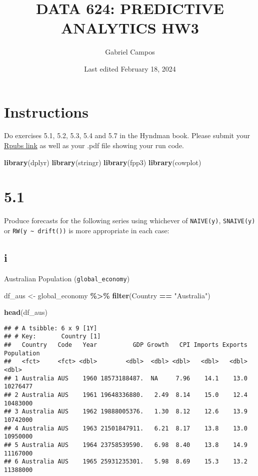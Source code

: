 \documentclass[
]{article}
\title{DATA 624: PREDICTIVE ANALYTICS HW3}
\author{Gabriel Campos}
\date{Last edited February 18, 2024}
\newenvironment{Shaded}{\begin{snugshade}}{\end{snugshade}}
\newcommand{\FunctionTok}[1]{\textcolor[rgb]{0.13,0.29,0.53}{\textbf{#1}}}
\newcommand{\NormalTok}[1]{#1}
\newcommand{\OtherTok}[1]{\textcolor[rgb]{0.56,0.35,0.01}{#1}}
\newcommand{\SpecialCharTok}[1]{\textcolor[rgb]{0.81,0.36,0.00}{\textbf{#1}}}
\newcommand{\StringTok}[1]{\textcolor[rgb]{0.31,0.60,0.02}{#1}}
\begin{document}
\maketitle

\hypertarget{instructions}{%
\section{Instructions}\label{instructions}}

Do exercises 5.1, 5.2, 5.3, 5.4 and 5.7 in the Hyndman book. Please
submit your \href{https://rpubs.com/gcampos100/DATA_624_HW3}{Rpubs link}
as well as your .pdf file showing your run code.

\begin{Shaded}
\begin{Highlighting}[]
\FunctionTok{library}\NormalTok{(dplyr)}
\FunctionTok{library}\NormalTok{(stringr)}
\FunctionTok{library}\NormalTok{(fpp3)}
\FunctionTok{library}\NormalTok{(cowplot)}
\end{Highlighting}
\end{Shaded}

\hypertarget{section}{%
\section{5.1}\label{section}}

Produce forecasts for the following series using whichever of
\texttt{NAIVE(y)}, \texttt{SNAIVE(y)} or
\texttt{RW(y\ \textasciitilde{}\ drift())} is more appropriate in each
case:

\hypertarget{i}{%
\subsection{i}\label{i}}

Australian Population (\texttt{global\_economy})

\begin{Shaded}
\begin{Highlighting}[]
\NormalTok{df\_aus }\OtherTok{\textless{}{-}}\NormalTok{ global\_economy }\SpecialCharTok{\%\textgreater{}\%}
            \FunctionTok{filter}\NormalTok{(Country }\SpecialCharTok{==} \StringTok{"Australia"}\NormalTok{)}

\FunctionTok{head}\NormalTok{(df\_aus)}
\end{Highlighting}
\end{Shaded}

\begin{verbatim}
## # A tsibble: 6 x 9 [1Y]
## # Key:       Country [1]
##   Country   Code   Year          GDP Growth   CPI Imports Exports Population
##   <fct>     <fct> <dbl>        <dbl>  <dbl> <dbl>   <dbl>   <dbl>      <dbl>
## 1 Australia AUS    1960 18573188487.  NA     7.96    14.1    13.0   10276477
## 2 Australia AUS    1961 19648336880.   2.49  8.14    15.0    12.4   10483000
## 3 Australia AUS    1962 19888005376.   1.30  8.12    12.6    13.9   10742000
## 4 Australia AUS    1963 21501847911.   6.21  8.17    13.8    13.0   10950000
## 5 Australia AUS    1964 23758539590.   6.98  8.40    13.8    14.9   11167000
## 6 Australia AUS    1965 25931235301.   5.98  8.69    15.3    13.2   11388000
\end{verbatim}
\end{document}
